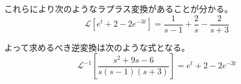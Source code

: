 \documentclass[12pt,b5paper]{ltjsarticle}
\begin{document}
\begin{enumerate}
      これらにより次のようなラプラス変換があることが分かる。
      \begin{equation}
       \mathcal{L}\left[ e^{t} + 2 -2e^{-3t} \right]
        = \frac{1}{s-1} + \frac{2}{s} - \frac{2}{s+3}
      \end{equation}

      よって求めるべき逆変換は次のような式となる。
      \begin{equation}
       \mathcal{L}^{-1}\left[ \frac{s^2+9s-6}{s(s-1)(s+3)} \right]
        = e^{t} + 2 -2e^{-3t}
      \end{equation}

\end{enumerate}
\end{document}
